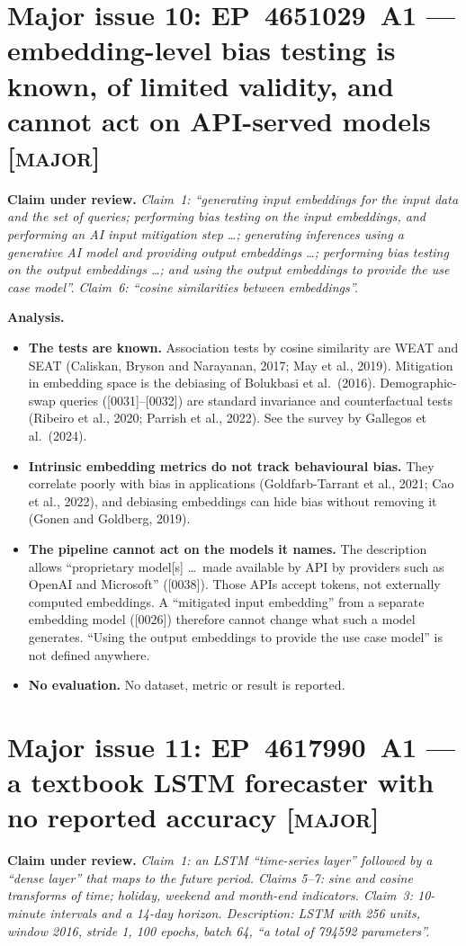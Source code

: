 \documentclass[10pt,a4paper]{article}
\newcommand{\claim}[1]{\noindent\textbf{Claim under review.} \emph{#1}\par\smallskip}
\newcommand{\sev}[1]{\textsc{\color{BrickRed}[#1]}}
\begin{document}
\section{Major issue 10: EP~4651029~A1 --- embedding-level bias testing is known, of limited validity, and cannot act on API-served models \sev{major}}\label{sec:bias}
\claim{Claim~1: ``generating input embeddings for the input data and the set of queries; performing bias testing on the input embeddings, and performing an AI input mitigation step \ldots; generating inferences using a generative AI model and providing output embeddings \ldots; performing bias testing on the output embeddings \ldots; and using the output embeddings to provide the use case model''. Claim~6: ``cosine similarities between embeddings''.}

\noindent\textbf{Analysis.}
\begin{itemize}
  \item \textbf{The tests are known.} Association tests by cosine similarity are WEAT and SEAT (Caliskan, Bryson and Narayanan, 2017; May et al., 2019). Mitigation in embedding space is the debiasing of Bolukbasi et al.\ (2016). Demographic-swap queries ([0031]--[0032]) are standard invariance and counterfactual tests (Ribeiro et al., 2020; Parrish et al., 2022). See the survey by Gallegos et al.\ (2024).
  \item \textbf{Intrinsic embedding metrics do not track behavioural bias.} They correlate poorly with bias in applications (Goldfarb-Tarrant et al., 2021; Cao et al., 2022), and debiasing embeddings can hide bias without removing it (Gonen and Goldberg, 2019).
  \item \textbf{The pipeline cannot act on the models it names.} The description allows ``proprietary model[s] \ldots\ made available by API by providers such as OpenAI and Microsoft'' ([0038]). Those APIs accept tokens, not externally computed embeddings. A ``mitigated input embedding'' from a separate embedding model ([0026]) therefore cannot change what such a model generates. ``Using the output embeddings to provide the use case model'' is not defined anywhere.
  \item \textbf{No evaluation.} No dataset, metric or result is reported.
\end{itemize}

\section{Major issue 11: EP~4617990~A1 --- a textbook LSTM forecaster with no reported accuracy \sev{major}}\label{sec:reserve}
\claim{Claim~1: an LSTM ``time-series layer'' followed by a ``dense layer'' that maps to the future period. Claims 5--7: sine and cosine transforms of time; holiday, weekend and month-end indicators. Claim~3: 10-minute intervals and a 14-day horizon. Description: LSTM with 256 units, window 2016, stride 1, 100 epochs, batch 64, ``a total of 794592 parameters''.}
\end{document}
